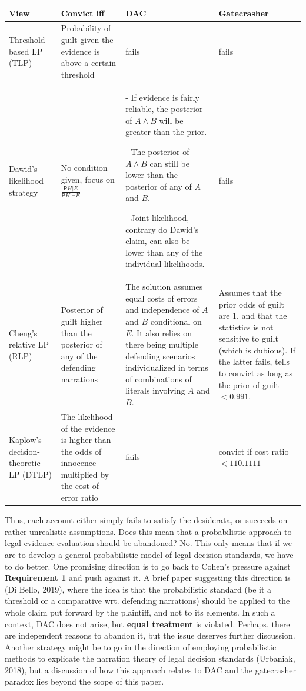 \documentclass[10pt,dvipsnames,enabledeprecatedfontcommands]{scrartcl}
\newcommand{\n}{\neg}
\newcommand{\et}{\wedge}
\newcommand{\pr}{\mathsf{P}}
\begin{document}
\begin{center}
\footnotesize 
 \begin{tabular}{@{}p{3cm}p{2.5cm}p{4cm}p{3cm}@{}}
\toprule
\textbf{View} & \textbf{Convict iff} & \textbf{DAC} & \textbf{Gatecrasher} \\ \midrule
Threshold-based LP (TLP) & Probability of guilt given the evidence is above a certain threshold & fails & fails \\
Dawid's likelihood strategy & No condition given, focus on $\frac{\pr{H\vert E}}{\pr{H\vert \n E}}$ & - If evidence is fairly reliable, the posterior of $A\et B$ will be greater than the prior.

- The posterior of $A\et B$ can still be lower than the posterior of any of $A$ and $B$.

- Joint likelihood, contrary do Dawid's claim, can also be lower than any of the individual likelihoods. & fails  \\
Cheng's relative LP (RLP)
& Posterior of guilt higher than the posterior of any of the defending narrations & The solution assumes equal costs of errors and independence of $A$ and $B$ conditional on $E$. It also relies on there being multiple defending scenarios individualized in terms of  combinations of literals involving $A$ and $B$. & Assumes that the prior odds of guilt are 1, and that the statistics is not sensitive to guilt (which is dubious). If the latter fails, tells to convict as long as the prior of guilt $<0.991$. \\
Kaplow's decision-theoretic LP (DTLP) &
The likelihood of the evidence is higher than the odds of innocence multiplied by the cost of error ratio & fails & convict if cost ratio $<110.1111$
\end{tabular} 
 \end{center}

Thus, each account either simply fails to satisfy the desiderata, or
succeeds on rather unrealistic assumptions. Does this mean that a
probabilistic approach to legal evidence evaluation should be abandoned?
No. This only means that if we are to develop a general probabilistic
model of legal decision standards, we have to do better. One promising
direction is to go back to Cohen's pressure against
\textbf{Requirement 1} and push against it. A brief paper suggesting
this direction is (Di Bello, 2019), where the idea is that the
probabilistic standard (be it a threshold or a comparative wrt.
defending narrations) should be applied to the whole claim put forward
by the plaintiff, and not to its elements. In such a context, DAC does
not arise, but \textbf{equal treatment} is violated. Perhaps, there are
independent reasons to abandon it, but the issue deserves further
discussion. Another strategy might be to go in the direction of
employing probabilistic methods to explicate the narration theory of
legal decision standards (Urbaniak, 2018), but a discussion of how this
approach relates to DAC and the gatecrasher paradox lies beyond the
scope of this paper.
\end{document}
